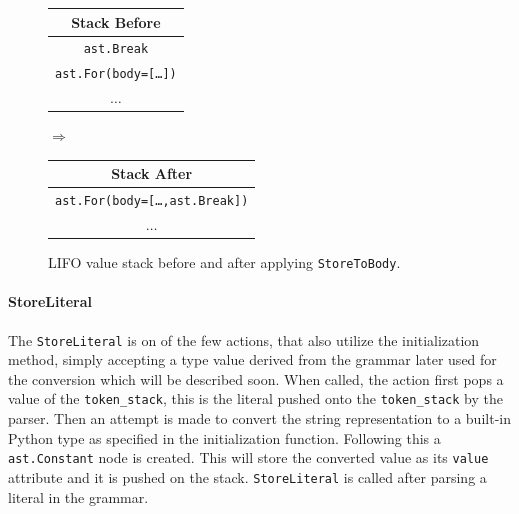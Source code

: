 \begin{figure}[H]\label{fig:storetobody-stack}
  \centering
  {\small

  \begin{tabular}{|c|}
    \hline
    \textbf{Stack Before} \\ \hline
    \texttt{\tiny{ast.}}\texttt{Break}\\ \hline
    \texttt{\tiny{ast.}}\texttt{For(body=[\dots])} \\ \hline
    \(\dots\)             \\ \hline
  \end{tabular}
  \hspace{0.25em}$\Longrightarrow$\hspace{0.25em}
  \begin{tabular}{|c|}
    \hline
    \textbf{Stack After} \\ \hline
    \texttt{\tiny{ast.}}\texttt{For(body=[\dots,}\texttt{\tiny{ast.}}\texttt{Break])} \\ \hline
    \(\dots\)                       \\ \hline
  \end{tabular}
  }
  \caption{LIFO value stack before and after applying \texttt{StoreToBody}.}
  
\end{figure}

\paragraph{StoreLiteral}
The \texttt{StoreLiteral} is on of the few actions, that also utilize the initialization method, simply accepting a type value derived from the grammar later used for the conversion which will be described soon. When called, the action first pops a value of the \texttt{token\_stack}, this is the literal pushed onto the \texttt{token\_stack} by the parser. Then an attempt is made to convert the string representation to a built-in Python type as specified in the initialization function. Following this a \texttt{ast.Constant} node is created. This will store the converted value as its \texttt{value} attribute and it is pushed on the stack. \texttt{StoreLiteral} is called after parsing a literal in the  grammar.


